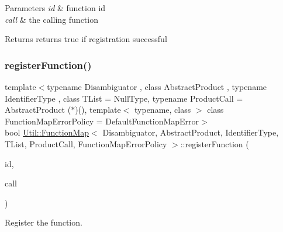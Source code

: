 \begin{DoxyParams}{Parameters}
{\em id} & function id \\
\hline
{\em call} & the calling function \\
\hline
\end{DoxyParams}
\begin{DoxyReturn}{Returns}
returns true if registration successful 
\end{DoxyReturn}
\mbox{\label{classUtil_1_1FunctionMap_a9668b22d7c1d46b48b069dfec3301aa4}} 
\subsubsection{\texorpdfstring{registerFunction()}{registerFunction()}\hspace{0.1cm}{\footnotesize\ttfamily [3/3]}}
{\footnotesize\ttfamily template$<$typename Disambiguator , class Abstract\+Product , typename Identifier\+Type , class T\+List  = Null\+Type, typename Product\+Call  = Abstract\+Product ($\ast$)(), template$<$ typename, class $>$ class Function\+Map\+Error\+Policy = Default\+Function\+Map\+Error$>$ \\
bool \mbox{\hyperlink{classUtil_1_1FunctionMap}{Util\+::\+Function\+Map}}$<$ Disambiguator, Abstract\+Product, Identifier\+Type, T\+List, Product\+Call, Function\+Map\+Error\+Policy $>$\+::register\+Function (\begin{DoxyParamCaption}\item[{const Identifier\+Type \&}]{id,  }\item[{Product\+Call}]{call }\end{DoxyParamCaption})\hspace{0.3cm}{\ttfamily [inline]}}



Register the function. 



